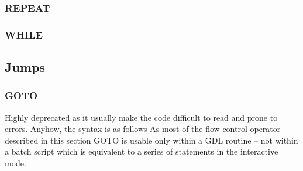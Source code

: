\subsubsection{REPEAT%
}
\subsubsection{WHILE%
}
\subsection{Jumps}
\subsubsection{GOTO}
Highly deprecated as it usually make the code difficult to read
  and prone to errors.
Anyhow, the syntax is as follows
As most of the flow control operator described in this section GOTO
  is usable only within a GDL routine -- not within a batch script
  which is equivalent to a series of statements in the interactive mode.
